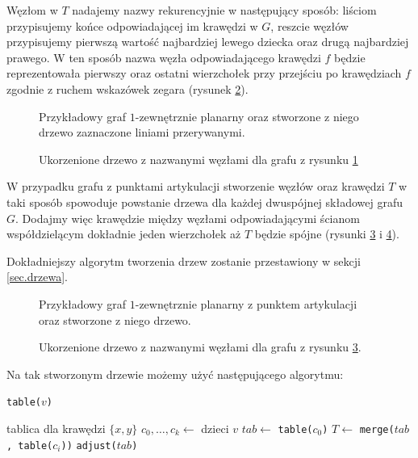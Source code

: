 \documentclass[twoside,a4paper,12pt]{report} %
\theoremstyle{break}
\begin{document}
Węzłom w $T$ nadajemy nazwy rekurencyjnie w następujący sposób: liściom przypisujemy końce odpowiadającej im krawędzi w $G$, reszcie węzłów przypisujemy pierwszą wartość najbardziej lewego dziecka oraz drugą najbardziej prawego. W ten sposób nazwa węzła odpowiadającego krawędzi $f$ będzie reprezentowała pierwszy oraz ostatni wierzchołek przy przejściu po krawędziach $f$ zgodnie z ruchem wskazówek zegara (rysunek \ref{drzewo}).

\begin{figure}[ht]
\begin{center}
    
\end{center}
\caption{Przykładowy graf $1$-zewnętrznie planarny oraz stworzone z niego drzewo zaznaczone liniami przerywanymi.}
\label{zew}
\end{figure}

\begin{figure}[ht]
    \centering
    
\caption{Ukorzenione drzewo z nazwanymi węzłami dla grafu z rysunku \ref{zew}}
\label{drzewo}
\end{figure}

W przypadku grafu z punktami artykulacji stworzenie węzłów oraz krawędzi $T$ w taki sposób spowoduje powstanie drzewa dla każdej dwuspójnej składowej grafu $G$. Dodajmy więc krawędzie między węzłami odpowiadającymi ścianom współdzielącym dokładnie jeden wierzchołek aż $T$ będzie spójne (rysunki \ref{art_tree} i \ref{drzewo_art}).

Dokładniejszy algorytm tworzenia drzew zostanie przestawiony w sekcji \ref{sec.drzewa}.

\begin{figure}[H]
\begin{center}
    
\end{center}
\caption{Przykładowy graf $1$-zewnętrznie planarny z punktem artykulacji oraz stworzone z niego drzewo.}
\label{art_tree}
\end{figure}

\begin{figure}[H]
    \centering
    
\caption{Ukorzenione drzewo z nazwanymi węzłami dla grafu z rysunku \ref{art_tree}.}
\label{drzewo_art}
\end{figure}

Na tak stworzonym drzewie możemy użyć następującego algorytmu:

\begin{algorithm}[H]
    \caption{\texttt{table($v$)}}
    \SetAlgoLined
     {
        \Return tablica dla krawędzi $\{x,y\}$\;
    }
    $c_0,\dots,c_k \gets$ dzieci $v$\;
    $tab \gets$ \texttt{table($c_0$)}\;
     {
        $T \gets$ \texttt{merge($tab$, table($c_i$))}\;
    }
    \Return \texttt{adjust($tab$)}\;
\end{algorithm}
\end{document}
